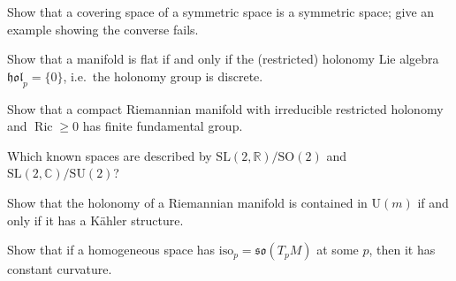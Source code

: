 \begin{remark}
  \label{rem:pet-ch10-exercise-covering-symmetric}
  Show that a covering space of a symmetric space is a symmetric space; give an
  example showing the converse fails.
\end{remark}

\begin{remark}
  \label{rem:pet-ch10-exercise-flat-discrete-holonomy}
  Show that a manifold is flat if and only if the (restricted) holonomy Lie
  algebra $\mathfrak{hol}_p=\{0\}$, i.e.\ the holonomy group is discrete.
\end{remark}

\begin{remark}
  \label{rem:pet-ch10-exercise-finite-fundamental-group}
  Show that a compact Riemannian manifold with irreducible restricted holonomy
  and $\operatorname{Ric}\ge0$ has finite fundamental group.
\end{remark}

\begin{remark}
  \label{rem:pet-ch10-exercise-sl2-quotients}
  Which known spaces are described by $\mathrm{SL}(2,\mathbb R)/\mathrm{SO}(2)$ and
  $\mathrm{SL}(2,\mathbb C)/\mathrm{SU}(2)$?
\end{remark}

\begin{remark}
  \label{rem:pet-ch10-exercise-kahler-unitary-holonomy}
  Show that the holonomy of a Riemannian manifold is contained in $\mathrm U(m)$
  if and only if it has a Kähler structure.
\end{remark}

\begin{remark}
  \label{rem:pet-ch10-exercise-isop-so-constant-curvature}
  Show that if a homogeneous space has $\mathrm{iso}_p=\mathfrak{so}(T_pM)$ at
  some $p$, then it has constant curvature.
\end{remark}

